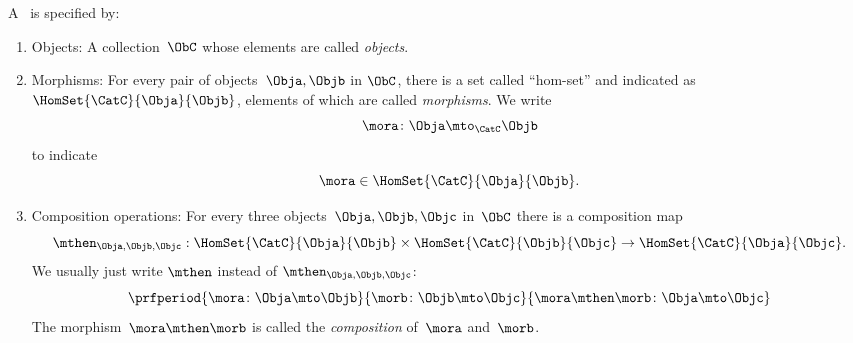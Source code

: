 \begin{ctdefinition}[Semicategory]
    \label{def:semicategory-compact}
    A \emph{}~\CatC is specified by:
    \begin{body}
        \constit
        \begin{enumerate}
            \item Objects: A collection\footnotemark~$\ObC$ whose elements are called \emph{objects}.
            \item Morphisms: For every pair of objects~$\Obja,\Objb$ in $\ObC$, there is a set called ``hom-set'' and indicated  as~$\HomSet{\CatC}{\Obja}{\Objb}$, elements of which are called \emph{morphisms}.
                  We write
                  \begin{equation}
                      \mora \colon \Obja \mto_\CatC \Objb
                  \end{equation}
                  to indicate
                  \begin{equation}
                      \mora \in \HomSet{\CatC}{\Obja}{\Objb}.
                  \end{equation}
            \item Composition operations: For every three objects~$\Obja,\Objb,\Objc$ in~$\ObC$ there is a composition map
                  \begin{equation}
                      \mthen_{\Obja,\Objb,\Objc}: \HomSet{\CatC}{\Obja}{\Objb} \times \HomSet{\CatC}{\Objb}{\Objc}\to \HomSet{\CatC}{\Obja}{\Objc}.
                  \end{equation}
                  We usually just write $\mthen$ instead of $\mthen_{\Obja,\Objb,\Objc}$:
                  \begin{equation}
                      \prfperiod{
                          \mora \colon \Obja \mto \Objb
                      }{
                          \morb\colon \Objb \mto \Objc
                      }{
                          \mora \mthen \morb \colon \Obja \mto \Objc
                      }
                  \end{equation}
                  The morphism~$\mora \mthen \morb$ is called the \emph{composition} of~$\mora$ and~$\morb$.
        \end{enumerate}

\end{body}
\end{ctdefinition}
